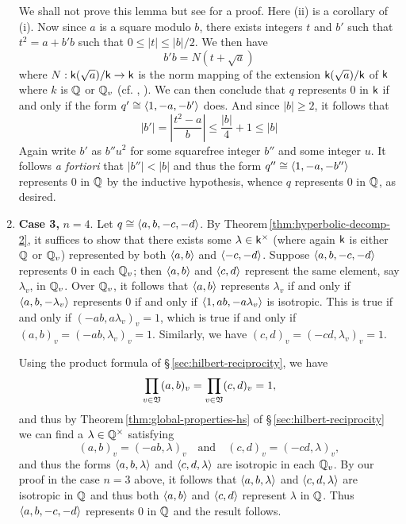 \begin{enumerate}[wide, nosep, label=(\alph*)]
    We shall not prove this lemma but see \cite[p.~42]{serre2012course} for a
    proof. Here (ii) is a corollary of (i). Now since \(a\) is a square modulo
    \(b\), there exists integers \(t\) and \(b'\) such that \(t^2 = a + b'b\)
    such that \(0 \leq |t| \leq |b|/2\). We then have
    \[ b'b = N(t + \sqrt{a})\] where \(N: \mathsf{k}(\sqrt{a})/\mathsf{k} \to \mathsf{k}\)
    is the norm mapping of the extension \(\mathsf{k}(\sqrt{a})/\mathsf{k}\) of
    \(\mathsf{k}\) where \(k\) is \(\mathbb{Q}\) or \(\mathbb{Q}_v\) (cf.
    \cite[p.940]{rotman2010advanced}, \cite[p.~289]{hungerford2012algebra}). We
    can then conclude that \(q\) represents \(0\) in \(\mathsf{k}\) if and only if
    the form \(q' \cong \langle 1, -a, -b' \rangle\) does. And since \(|b| \geq 2\),
    it follows that
    \[
        |b'| = \left|\frac{t^2-a}{b}\right| \leq \frac{|b|}{4} + 1 \leq |b|
    \]
    Again write \(b'\) as \(b''u^2\) for some squarefree integer \(b''\) and
    some integer \(u\). It follows \emph{a fortiori} that \(|b''| < |b|\) and
    thus the form \(q'' \cong \langle 1, -a, -b'' \rangle\) represents \(0\) in
    \(\mathbb{Q}\) by the inductive hypothesis, whence \(q\) represents \(0\) in
    \(\mathbb{Q}\), as desired.

    \item \textbf{Case 3,} \(n = 4\). Let \(q \cong \langle a, b, -c, -d \rangle\).
    By Theorem\,\ref{thm:hyperbolic-decomp-2}, it suffices to show that there
    exists some \(\lambda \in \mathsf{k}^{\times}\) (where again \(\mathsf{k}\) is either
    \(\mathbb{Q}\) or \(\mathbb{Q}_v\)) represented by both \(\langle a, b \rangle\)
    and \(\langle -c, -d \rangle\). Suppose \(\langle a, b, -c, -d \rangle\) represents
    \(0\) in each \(\mathbb{Q}_v\); then \(\langle a, b \rangle\) and \(\langle c,
    d \rangle\) represent the same element, say \(\lambda_v\), in \(\mathbb{Q}_v\).
    Over \(\mathbb{Q}_v\), it follows that \(\langle a, b \rangle\) represents
    \(\lambda_v\) if and only if \(\langle a, b, -\lambda_v \rangle\) represents
    \(0\) if and only if \(\langle 1, ab, -a\lambda_v \rangle\) is isotropic. This is
    true if and only if \((-ab, a\lambda_v)_v = 1\), which is true if and only
    if \((a, b)_v = (-ab, \lambda_v)_v = 1\). Similarly, we have \((c,d)_v =
    (-cd, \lambda_v)_v = 1\).
    
    Using the product formula of \S\,\ref{sec:hilbert-reciprocity}, we have 
    \[
        \prod_{v \in \mathfrak{V}} (a, b)_v = \prod_{v \in \mathfrak{V}} (c, d)_v = 1,
    \]
    and thus by Theorem\,\ref{thm:global-properties-hs} of
    \S\,\ref{sec:hilbert-reciprocity} we can find a \(\lambda \in
    \mathbb{Q}^{\times}\) satisfying
    \[
        (a, b)_v = (-ab, \lambda)_v \quad \text{and} \quad (c, d)_v = (-cd, \lambda)_v,
    \]
    and thus the forms \(\langle a, b, \lambda \rangle\) and \(\langle c, d,
    \lambda \rangle\) are isotropic in each \(\mathbb{Q}_v\). By our proof in the case
    \(n = 3\) above, it follows that \(\langle a, b, \lambda \rangle\) and
    \(\langle c, d, \lambda \rangle\) are isotropic in \(\mathbb{Q}\) and thus both
    \(\langle a,b \rangle\) and \(\langle c,d \rangle\) represent \(\lambda\) in
    \(\mathbb{Q}\). Thus \(\langle a, b, -c, -d \rangle\) represents \(0\) in
    \(\mathbb{Q}\) and the result follows.\label{hm-case:4}
    

\end{enumerate}
